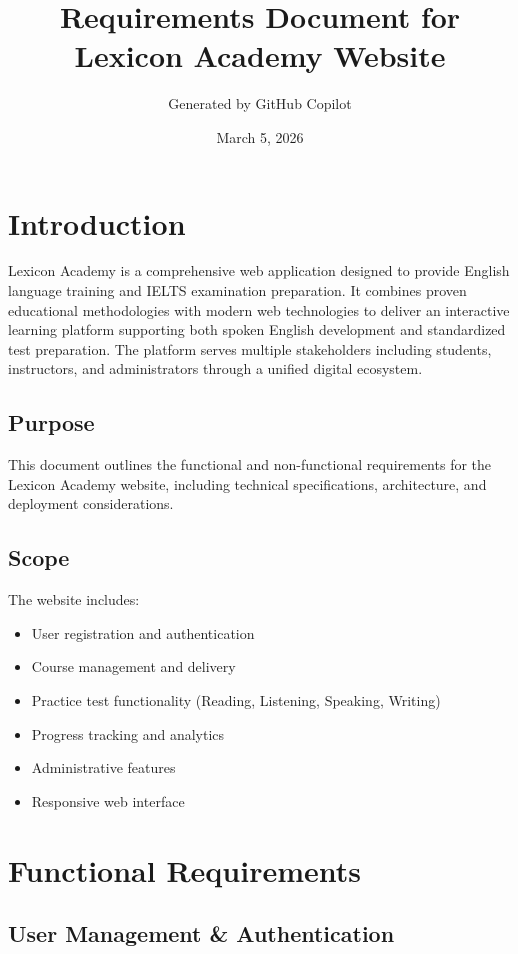 \documentclass{article}
\title{Requirements Document for Lexicon Academy Website}
\author{Generated by GitHub Copilot}
\date{March 5, 2026}
\begin{document}
\maketitle

\tableofcontents
\newpage

\section{Introduction}

Lexicon Academy is a comprehensive web application designed to provide English language training and IELTS examination preparation. It combines proven educational methodologies with modern web technologies to deliver an interactive learning platform supporting both spoken English development and standardized test preparation. The platform serves multiple stakeholders including students, instructors, and administrators through a unified digital ecosystem.

\subsection{Purpose}
This document outlines the functional and non-functional requirements for the Lexicon Academy website, including technical specifications, architecture, and deployment considerations.

\subsection{Scope}
The website includes:
\begin{itemize}
    \item User registration and authentication
    \item Course management and delivery
    \item Practice test functionality (Reading, Listening, Speaking, Writing)
    \item Progress tracking and analytics
    \item Administrative features
    \item Responsive web interface
\end{itemize}

\section{Functional Requirements}

\subsection{User Management \& Authentication}
\end{document}
